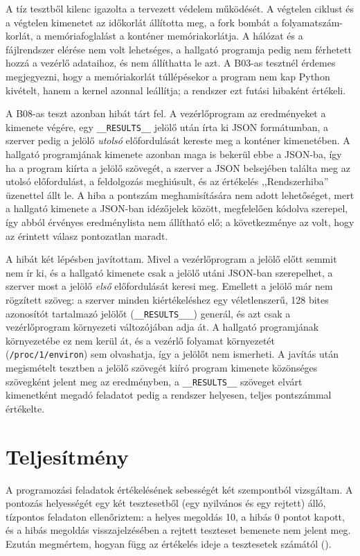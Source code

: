 A tíz tesztből kilenc igazolta a tervezett védelem működését. A végtelen ciklust és a végtelen
kimenetet az időkorlát állította meg, a fork bombát a folyamatszám-korlát, a memóriafoglalást a
konténer memóriakorlátja. A hálózat és a fájlrendszer elérése nem volt lehetséges, a hallgató
programja pedig nem férhetett hozzá a vezérlő adataihoz, és nem állíthatta le azt. A B03-as
tesztnél érdemes megjegyezni, hogy a memóriakorlát túllépésekor a program nem kap Python
kivételt, hanem a kernel azonnal leállítja; a rendszer ezt futási hibaként értékeli.

A B08-as teszt azonban hibát tárt fel. A vezérlőprogram az eredményeket a kimenete végére, egy
\texttt{\_\_RESULTS\_\_} jelölő után írta ki JSON formátumban, a szerver pedig a jelölő
\textit{utolsó} előfordulását kereste meg a konténer kimenetében. A hallgató programjának kimenete
azonban maga is bekerül ebbe a JSON-ba, így ha a program kiírta a jelölő szövegét, a szerver a
JSON belsejében találta meg az utolsó előfordulást, a feldolgozás meghiúsult, és az értékelés
,,Rendszerhiba'' üzenettel állt le. A hiba a pontszám meghamisítására nem adott lehetőséget, mert a
hallgató kimenete a JSON-ban idézőjelek között, megfelelően kódolva szerepel, így abból érvényes
eredménylista nem állítható elő; a következménye az volt, hogy az érintett válasz pontozatlan maradt.

A hibát két lépésben javítottam. Mivel a vezérlőprogram a jelölő előtt semmit nem ír ki, és a
hallgató kimenete csak a jelölő utáni JSON-ban szerepelhet, a szerver most a jelölő
\textit{első} előfordulását keresi meg. Emellett a jelölő már nem rögzített szöveg: a szerver
minden kiértékeléshez egy véletlenszerű, 128 bites azonosítót tartalmazó jelölőt
(\texttt{\_\_RESULTS\_<véletlen hexa>\_\_}) generál, és azt csak a vezérlőprogram környezeti
változójában adja át. A hallgató programjának környezetébe ez nem kerül át, és a vezérlő
folyamat környezetét (\texttt{/proc/1/environ}) sem olvashatja, így a jelölőt nem ismerheti.
A javítás után megismételt tesztben a jelölő szövegét kiíró program kimenete közönséges
szövegként jelent meg az eredményben, a \texttt{\_\_RESULTS\_\_} szöveget elvárt kimenetként
megadó feladatot pedig a rendszer helyesen, teljes pontszámmal értékelte.

\section{Teljesítmény}
\label{sec:teljesitmeny}

A programozási feladatok értékelésének sebességét két szempontból vizsgáltam. A pontozás
helyességét egy két tesztesetből (egy nyilvános és egy rejtett) álló, tízpontos feladaton
ellenőriztem: a helyes megoldás 10, a hibás 0 pontot kapott, és a hibás megoldás visszajelzésében
a rejtett teszteset bemenete nem jelent meg. Ezután megmértem, hogyan függ az értékelés ideje a
tesztesetek számától ().

